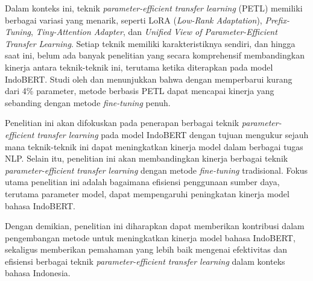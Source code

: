 Dalam konteks ini, teknik \textit{parameter-efficient transfer learning} (PETL) memiliki berbagai variasi yang menarik, seperti LoRA (\textit{Low-Rank Adaptation}), \textit{Prefix-Tuning}, \textit{Tiny-Attention Adapter}, dan \textit{Unified View of Parameter-Efficient Transfer Learning}. Setiap teknik memiliki karakteristiknya sendiri, dan hingga saat ini, belum ada banyak penelitian yang secara komprehensif membandingkan kinerja antara teknik-teknik ini, terutama ketika diterapkan pada model IndoBERT. Studi oleh \citeauthor{parameter} dan \citeauthor{uvpl} menunjukkan bahwa dengan memperbarui kurang dari 4\% parameter, metode berbasis PETL dapat mencapai kinerja yang sebanding dengan metode \textit{fine-tuning} penuh.

Penelitian ini akan difokuskan pada penerapan berbagai teknik \textit{parameter-efficient transfer learning} pada model IndoBERT dengan tujuan mengukur sejauh mana teknik-teknik ini dapat meningkatkan kinerja model dalam berbagai tugas NLP. Selain itu, penelitian ini akan membandingkan kinerja berbagai teknik \textit{parameter-efficient transfer learning} dengan metode \textit{fine-tuning} tradisional. Fokus utama penelitian ini adalah bagaimana efisiensi penggunaan sumber daya, terutama parameter model, dapat mempengaruhi peningkatan kinerja model bahasa IndoBERT.

Dengan demikian, penelitian ini diharapkan dapat memberikan kontribusi dalam pengembangan metode untuk meningkatkan kinerja model bahasa IndoBERT, sekaligus memberikan pemahaman yang lebih baik mengenai efektivitas dan efisiensi berbagai teknik \textit{parameter-efficient transfer learning} dalam konteks bahasa Indonesia.